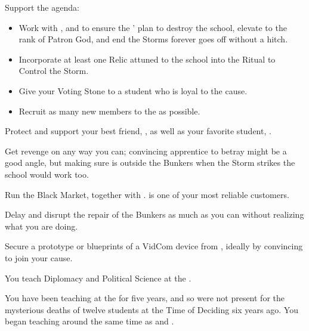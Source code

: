 \documentclass[char]{GL2020}
\begin{document}
\begin{itemz}

    \item Support the \pGoaties{} agenda:
\begin{itemize}
     \item Work with \cChupLeader{}, \cChupSecond{} and \cChupStudent{} to ensure the \pGoaties{}' plan to destroy the school, elevate \cGenesis{} to the rank of Patron God, and end the Storms forever goes off without a hitch. 
    \item Incorporate at least one Relic attuned to the school into the Ritual to Control the Storm. 
    \item Give your Voting Stone to a student who is loyal to the cause.
    \item Recruit as many new members to the \pGoaties{} as possible.
\end{itemize}
    \item Protect and support your best friend, \cHeadScientist{}, as well as your favorite student, \cTechStar{}.
    \item Get revenge on \cAntiChup{} any way you can; convincing \cAntiChup{\their} apprentice \cScholarship{} to betray \cAntiChup{\them} might be a good angle, but making sure \cAntiChup{} is outside the Bunkers when the Storm strikes the school would work too.
\end{itemz}

\begin{itemz}
    \item Run the Black Market, together with \cChupSecond{}. \cHedonist{} is one of your most reliable customers.
    \item Delay and disrupt the repair of the Bunkers as much as you can without \cBunker{} realizing what you are doing.
    \item Secure a prototype or blueprints of a VidCom device from \cTechStar{}, ideally by convincing \cTechStar{\them} to join your cause. 
\end{itemz}

\begin{itemz}[Notes]
    \item You teach Diplomacy and Political Science at the \pSchool{}.
    \item You have been teaching at the \pSc{} for five years, and so were not present for the mysterious deaths of twelve students at the Time of Deciding six years ago. You began teaching around the same time as \cPrince{} and \cChupSecond{}.
\end{itemz}
\end{document}
